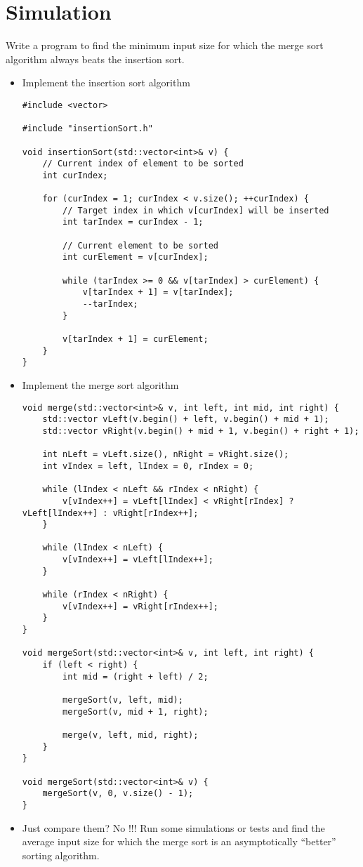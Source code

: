 \documentclass[12pt]{article}
\begin{document}
\section{Simulation}

Write a program to find the minimum input size for which the merge sort algorithm always beats the insertion sort.

\begin{itemize}
    \item Implement the insertion sort algorithm
    
    \begin{lstlisting}
#include <vector>

#include "insertionSort.h"

void insertionSort(std::vector<int>& v) {
	// Current index of element to be sorted
	int curIndex;

	for (curIndex = 1; curIndex < v.size(); ++curIndex) {
		// Target index in which v[curIndex] will be inserted
		int tarIndex = curIndex - 1;		

		// Current element to be sorted
		int curElement = v[curIndex];

		while (tarIndex >= 0 && v[tarIndex] > curElement) {
			v[tarIndex + 1] = v[tarIndex];
			--tarIndex;
		}

		v[tarIndex + 1] = curElement;
	}
}
    \end{lstlisting}
    
    \item Implement the merge sort algorithm
    
        \begin{lstlisting}
void merge(std::vector<int>& v, int left, int mid, int right) {
	std::vector vLeft(v.begin() + left, v.begin() + mid + 1);
	std::vector vRight(v.begin() + mid + 1, v.begin() + right + 1);

	int nLeft = vLeft.size(), nRight = vRight.size();
	int vIndex = left, lIndex = 0, rIndex = 0;

	while (lIndex < nLeft && rIndex < nRight) {
		v[vIndex++] = vLeft[lIndex] < vRight[rIndex] ? vLeft[lIndex++] : vRight[rIndex++];
	}

	while (lIndex < nLeft) {
		v[vIndex++] = vLeft[lIndex++];
	}
	
	while (rIndex < nRight) {
		v[vIndex++] = vRight[rIndex++];
	}
}

void mergeSort(std::vector<int>& v, int left, int right) {
	if (left < right) {
		int mid = (right + left) / 2;

		mergeSort(v, left, mid);
		mergeSort(v, mid + 1, right);

		merge(v, left, mid, right);
	}
}

void mergeSort(std::vector<int>& v) {
	mergeSort(v, 0, v.size() - 1);
}
    \end{lstlisting}
    
    \item Just compare them? No !!! Run some simulations or tests and find the average input size for which the merge sort is an asymptotically ``better'' sorting algorithm.
\end{itemize}
\end{document}

